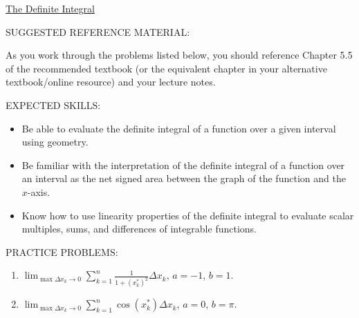 \documentclass[12pt]{article}
\newif\ifans
\begin{document}
\begin{center}
\underline{\LARGE{The Definite Integral}}
\end{center}

\noindent SUGGESTED REFERENCE MATERIAL:

\bigskip

\noindent As you work through the problems listed below, you should reference Chapter 5.5 of the recommended textbook (or the equivalent chapter in your alternative textbook/online resource) and your lecture notes.

\bigskip

\noindent EXPECTED SKILLS:

\begin{itemize}

\item Be able to evaluate the definite integral of a function over a given interval using geometry.

\item Be familiar with the interpretation of the definite integral of a function over an interval as the net signed area between the graph of the function and the $x$-axis.

\item Know how to use linearity properties of the definite integral to evaluate scalar multiples, sums, and differences of integrable functions.  

\end{itemize}

\noindent PRACTICE PROBLEMS:

\medskip


\begin{enumerate}

\item $\lim_{\max \Delta x_k \rightarrow 0} \sum_{k=1}^n \frac{1}{1+(x_k^*)^2} \Delta x_k$, $a=-1$, $b=1$.

\ifans{\fbox{$\int_{-1}^1{\frac{1}{1+x^2}} \,dx$}} \fi

\item $\lim_{\max \Delta x_k \rightarrow 0} \sum_{k=1}^n \cos{(x_k^*)} \Delta x_k$, $a=0$, $b=\pi$.

\ifans{\fbox{$\int_0^{\pi}\cos{x} \,dx$}} \fi

\end{enumerate}
\end{document}
